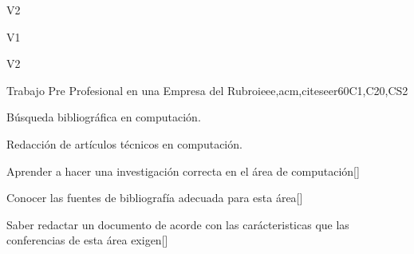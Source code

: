\begin{syllabus}
\begin{outcomes}{V2}
  \item {}
  \item {}
  \item {}
  \item {}
\end{outcomes}

\begin{competences}{V1}
    \item {} 
    \item {}
    \item {}
\end{competences}

\begin{competences}{V2}
    \item {} 
    \item {}
    \item {}
\end{competences}

\begin{unit}{}{Trabajo Pre Profesional en una Empresa del Rubro}{ieee,acm,citeseer}{60}{C1,C20,CS2}
  \begin{topics}
      \item Búsqueda bibliográfica en computación.
      \item Redacción de artículos técnicos en computación.
  \end{topics}
  \begin{learningoutcomes}
      \item Aprender a hacer una investigación correcta en el área de computación[\Usage]
      \item Conocer las fuentes de bibliografía adecuada para esta área[\Usage]
      \item Saber redactar un documento de acorde con las carácteristicas que las conferencias de esta área exigen[\Usage]
  \end{learningoutcomes}
\end{unit}

\begin{coursebibliography}
\end{coursebibliography}

\end{syllabus}
